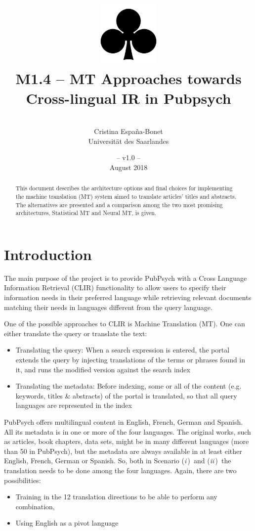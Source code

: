 \documentclass[a4paper,11pt]{article}
\title{
\includegraphics[width=3cm]{./img/200px-SuitClubs.png} \\
\Huge M1.4 -- MT Approaches towards Cross-lingual IR in Pubpsych}
\author{\vspace*{1cm}\\ \LARGE Cristina Espa\~na-Bonet \medskip \\ \Large Universit\"at des Saarlandes}
\date{\vspace*{2cm} -- v1.0 --\\August 2018}
\newcommand{\Ni}{({\em i\,})~}
\newcommand{\Nii}{({\em ii\,})~}
\begin{document}
\clearpage\maketitle
\thispagestyle{empty}\thispagestyle{empty}

\vspace*{5cm}
\begin{abstract}
This document describes the architecture options and final choices for implementing the machine translation (MT) system aimed to translate articles' titles and abstracts. The alternatives are presented and a comparison among the two most promising architectures, Statistical MT and Neural MT, is given. 
\end{abstract}

\newpage
\tableofcontents
\clearpage

\section{Introduction}
\label{s:intro}

The main purpose of the project is to provide PubPsych with a Cross Language Information Retrieval (CLIR) functionality to allow users to specify their information needs in their preferred language while retrieving relevant documents matching their needs in languages different from the query language.

One of the possible approaches to CLIR is Machine Translation (MT). One can either translate the query or translate the text:

\begin{itemize}
\itemsep0em 
 \item[\Ni] Translating the query: When a search expression is entered, the portal extends the query by injecting translations of the terms or phrases found in it, and runs the modified version against the search index
 \item[\Nii] Translating the metadata: Before indexing, some or all of the content (e.g. keywords, titles \& abstracts) of the portal is translated, so that all query languages are represented in the index
\end{itemize}

PubPsych offers multilingual content in English, French, German and Spanish. All its metadata is in one or more of the four languages. The original works, such as articles, book chapters, data sets, might be in many different languages (more than 50 in PubPsych), but the metadata are always available in at least either English, French, German or Spanish. So, both in Scenario \Ni and \Nii the translation needs to be done among the four languages. Again, there are two possibilities:
\begin{itemize}
\itemsep0em 
 \item[\Ni] Training in the 12 translation directions to be able to perform any combination,
 \item[\Nii] Using English as a pivot language
\end{itemize}
\end{document}

